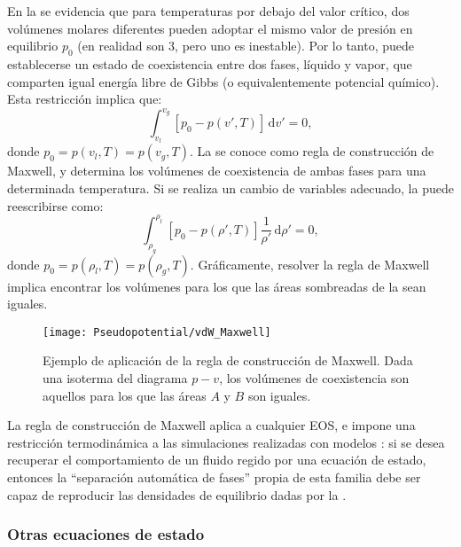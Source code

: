 En la  se evidencia que para temperaturas por debajo del valor cr\'itico, dos vol\'umenes molares diferentes pueden adoptar el mismo valor de presi\'on en equilibrio $p_0$ (en realidad son 3, pero uno es inestable). Por lo tanto, puede establecerse un estado de coexistencia entre dos fases, l\'iquido y vapor, que comparten igual energ\'ia libre de Gibbs (o equivalentemente potencial qu\'imico). Esta restricci\'on implica que:
\begin{equation}
	\int_{v_l}^{v_g} \left[p_0 - p(v',T)\right] \, \mbox{d} v' = 0,
	\label{eq:maxwell_constr}
\end{equation}
donde $p_0 = p(v_l,T) = p(v_g,T)$. La  se conoce como regla de construcci\'on de Maxwell, y determina los vol\'umenes de coexistencia de ambas fases para una determinada temperatura. Si se realiza un cambio de variables adecuado, la  puede reescribirse como:
\begin{equation}
	\int_{\rho_g}^{\rho_l} \left[p_0 - p(\rho',T)\right] \dfrac{1}{\rho'} \, \mbox{d} \rho' = 0,
	\label{eq:maxwell_constr_rho}
\end{equation}
donde $p_0 = p(\rho_l,T) = p(\rho_g,T)$. Gr\'aficamente, resolver la regla de Maxwell implica encontrar los vol\'umenes para los que las \'areas sombreadas de la  sean iguales. 

\begin{figure}[ht]
	\centering
	\texttt{[image: Pseudopotential/vdW\_Maxwell]}
	\caption{Ejemplo de aplicaci\'on de la regla de construcci\'on de Maxwell. Dada una isoterma del diagrama $p-v$, los vol\'umenes de coexistencia son aquellos para los que las \'areas $A$ y $B$ son iguales.}
	\label{fig:vdW_Maxwell}
\end{figure}


La regla de construcci\'on de Maxwell aplica a cualquier EOS, e impone una restricci\'on termodin\'amica a las simulaciones realizadas con modelos \pp{}: si se desea recuperar el comportamiento de un fluido regido por una ecuaci\'on de estado, entonces la ``separaci\'on autom\'atica de fases'' propia de esta familia debe ser capaz de reproducir las densidades de equilibrio dadas por la .


\subsubsection*{Otras ecuaciones de estado}


